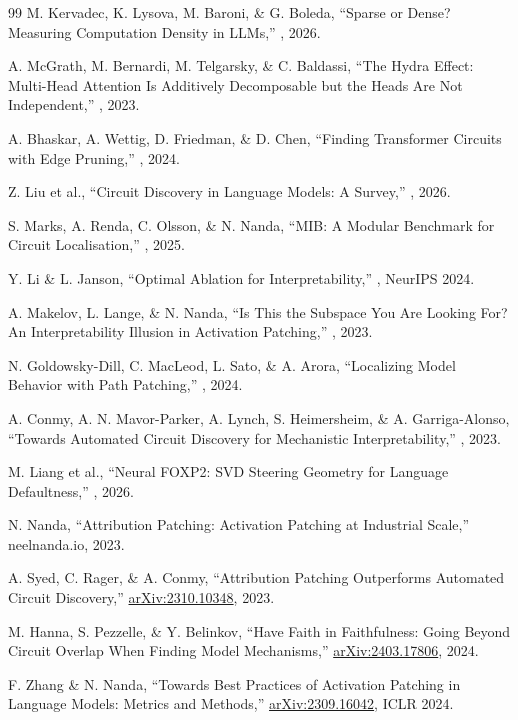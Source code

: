 \documentclass[11pt,a4paper]{article}
\newcommand{\arxiv}[1]{\href{https://arxiv.org/abs/#1}{arXiv:#1}}
\begin{document}
\begin{thebibliography}{99}
 M. Kervadec, K. Lysova, M. Baroni, \& G. Boleda, ``Sparse or
  Dense? Measuring Computation Density in LLMs,'' , 2026.

 A. McGrath, M. Bernardi, M. Telgarsky, \& C. Baldassi, ``The
  Hydra Effect: Multi-Head Attention Is Additively Decomposable but the Heads Are
  Not Independent,'' , 2023.

 A. Bhaskar, A. Wettig, D. Friedman, \& D. Chen, ``Finding
  Transformer Circuits with Edge Pruning,'' , 2024.

 Z. Liu et al., ``Circuit Discovery in Language Models: A
  Survey,'' , 2026.

 S. Marks, A. Renda, C. Olsson, \& N. Nanda, ``MIB: A Modular
  Benchmark for Circuit Localisation,'' , 2025.

 Y. Li \& L. Janson, ``Optimal Ablation for
  Interpretability,'' , NeurIPS 2024.

 A. Makelov, L. Lange, \& N. Nanda, ``Is This the
  Subspace You Are Looking For? An Interpretability Illusion in Activation
  Patching,'' , 2023.

 N. Goldowsky-Dill, C. MacLeod, L. Sato, \& A. Arora,
  ``Localizing Model Behavior with Path Patching,'' , 2024.

 A. Conmy, A. N. Mavor-Parker, A. Lynch, S. Heimersheim, \& A.
  Garriga-Alonso, ``Towards Automated Circuit Discovery for Mechanistic
  Interpretability,'' , 2023.

 M. Liang et al., ``Neural FOXP2: SVD Steering Geometry for
  Language Defaultness,'' , 2026.

 N. Nanda, ``Attribution Patching: Activation
  Patching at Industrial Scale,'' neelnanda.io, 2023.

 A. Syed, C. Rager, \& A. Conmy, ``Attribution Patching
  Outperforms Automated Circuit Discovery,'' \arxiv{2310.10348}, 2023.

 M. Hanna, S. Pezzelle, \& Y. Belinkov, ``Have Faith in
  Faithfulness: Going Beyond Circuit Overlap When Finding Model Mechanisms,''
  \arxiv{2403.17806}, 2024.

 F. Zhang \& N. Nanda, ``Towards Best Practices of
  Activation Patching in Language Models: Metrics and Methods,''
  \arxiv{2309.16042}, ICLR 2024.

\end{thebibliography}
\end{document}
